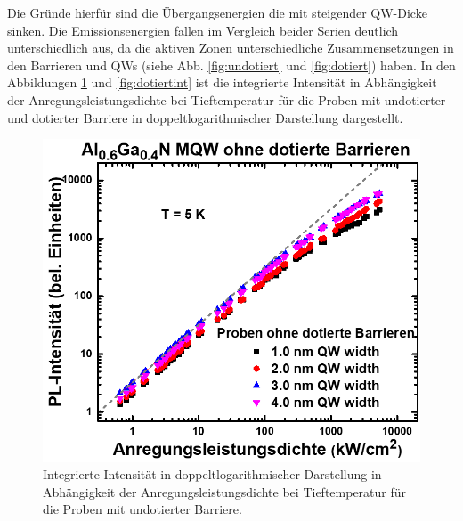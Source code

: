 \noindent 
Die Gründe hierfür sind die Übergangsenergien die mit steigender QW-Dicke \cite{doi:10.1063/1.371241} sinken. 
Die Emissionsenergien fallen im Vergleich beider Serien deutlich unterschiedlich aus, da die aktiven Zonen unterschiedliche Zusammensetzungen in den Barrieren und QWs (siehe Abb. \ref{fig:undotiert} und \ref{fig:dotiert}) haben. 
\newline
In den Abbildungen \ref{fig:undotiertint} und \ref{fig:dotiertint} ist die integrierte Intensität in Abhängigkeit der Anregungsleistungsdichte bei Tieftemperatur für die Proben mit undotierter und dotierter Barriere in doppeltlogarithmischer Darstellung dargestellt.
\begin{figure}[H]
  \centering
  \begin{minipage}[t]{0.49\textwidth}
    \centering
    \includegraphics[width=\textwidth]{Bilder/MQWdickenSerie/intTTundotiert.png}
		\caption{Integrierte Intensität in doppeltlogarithmischer Darstellung in Abhängigkeit der Anregungsleistungsdichte bei Tieftemperatur für die Proben mit undotierter Barriere.}
    \label{fig:undotiertint}
  \end{minipage}
	\hfill
  \begin{minipage}[t]{0.49\textwidth}
    \centering

\end{minipage}
\end{figure}
